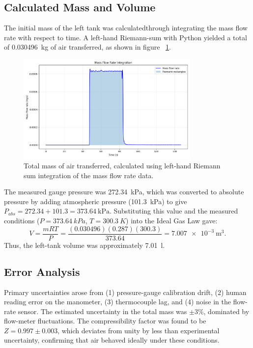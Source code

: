 \documentclass[12pt]{article}
\begin{document}
\subsection*{Calculated Mass and Volume}

The initial mass of the left tank was calculatedthrough integrating the mass flow rate with respect to time. A left-hand Riemann-sum with Python \cite{integrate_script} yielded a total of \SI{0.030496}{\kilogram} of air transferred, as shown in figure ~\ref{fig:massintegration}.
\begin{figure}[h!]
\centering
\includegraphics[width=0.8\textwidth]{massintegration.png}
\caption{Total mass of air transferred, calculated using left-hand Riemann sum integration of the mass flow rate data.}
\label{fig:massintegration}
\end{figure}
The measured gauge pressure was \SI{272.34}{\kPa}, which was converted to absolute pressure by adding atmospheric pressure (\SI{101.3}{\kPa}) to give \(P_{abs} = 272.34 + 101.3 = \SI{373.64}{\kPa}\). Substituting this value and the measured conditions (\(P = 373.64~\si{kPa}\), \(T = 300.3~\si{K}\)) into the Ideal Gas Law gave:
\[
V = \frac{mRT}{P} =
\frac{(0.030496)(0.287)(300.3)}{373.64} =
\SI{7.007e-3}{\metre\cubed}.
\]
Thus, the left-tank volume was approximately \SI{7.01}{\litre}.


\subsection*{Error Analysis}
Primary uncertainties arose from (1) pressure-gauge calibration drift, (2) human reading error on the manometer, (3) thermocouple lag, and (4) noise in the flow-rate sensor.  
The estimated uncertainty in the total mass was \(\pm 3\%\), dominated by flow-meter fluctuations.  
The compressibility factor was found to be \(Z = 0.997 \pm 0.003\), which deviates from unity by less than experimental uncertainty, confirming that air behaved ideally under these conditions.
\end{document}
